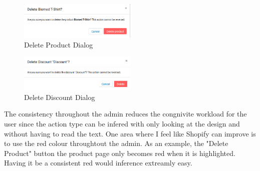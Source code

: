 \documentclass[12pt]{article}
\begin{document}
	\begin{figure}[!ht]
		\centering
		\includegraphics[width=0.5\textwidth]{delete-product}
		\caption{Delete Product Dialog}
		\label{delete-product}
	\end{figure}
	
	\begin{figure}[!ht]
		\centering
		\includegraphics[width=0.5\textwidth]{delete-discount}
		\caption{Delete Discount Dialog}
		\label{delete-discount}
	\end{figure}
	
	The consistency throughout the admin reduces the congnivite workload for the user since the action type can be infered with only looking at the design and without having to read the text. One area where I feel like Shopify can improve is to use the red colour throughtout the admin. As an example, the "Delete Product" button the product page only becomes red when it is highlighted. Having it be a consistent red would inference extreamly easy.
	
	
\end{document}
